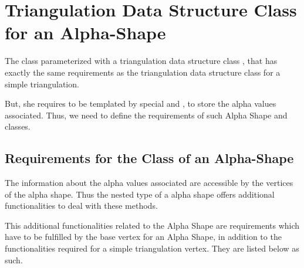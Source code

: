 \section*{Triangulation Data Structure Class for an Alpha-Shape}

The class  parameterized with a
triangulation data structure class , that has exactly the same
requirements as the triangulation data structure class for a simple
triangulation.  

But, she requires to be templated by special  and
, to store the alpha values associated. Thus, we need to
define the requirements of such Alpha Shape  and
 classes.

\subsection{Requirements for the \protect {} Class of an
Alpha-Shape\label{I1_SectVertex}} 

The information about the alpha values associated  are accessible by the 
vertices of the alpha shape. Thus the nested 
type of a alpha shape offers additional functionalities to deal with these
methods. 

This additional functionalities related to the Alpha Shape
are requirements which have to be fulfilled
by the base vertex for an Alpha Shape,
in addition to the functionalities required for a simple triangulation vertex.
They are listed below as such.

\ccInheritsFrom


